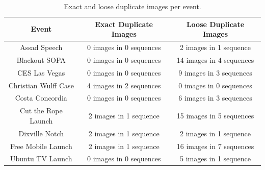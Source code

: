 \documentclass{acm_proc_article-sp}
\begin{document}
\begin{table}[htbp]
  \begin{tabular}{ | c | c | c | }
    \hline
    \textbf{Event} & \textbf{Exact Duplicate Images} & \textbf{Loose Duplicate Images}\\
    \hline
    Assad Speech & 0 images in 0 sequences & 2 images in 1 sequence\\
    Blackout SOPA & 0 images in 0 sequences & 14 images in 4 sequences\\
    CES Las Vegas & 0 images in 0 sequences & 9 images in 3 sequences\\
    Christian Wulff Case & 4 images in 2 sequences & 0 images in 0 sequences\\
    Costa Concordia & 0 images in 0 sequences & 6 images in 3 sequences\\
    Cut the Rope Launch & 2 images in 1 sequence & 15 images in 5 sequences\\
    Dixville Notch & 2 images in 1 sequence & 2 images in 1 sequence\\
    Free Mobile Launch & 2 images in 1 sequence & 16 images in 7 sequences\\
    Ubuntu TV Launch & 0 images in 0 sequences & 5 images in 1 sequence\\
    \hline
  \end{tabular}
  \label{tab:duplicateimages}
  \caption{Exact and loose duplicate images per event.}
\end{table}
\end{document}
